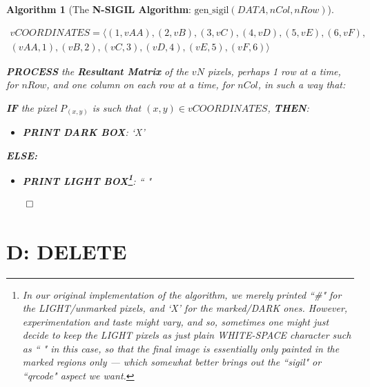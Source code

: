 \documentclass[a4paper, 18pt]{book} %
\newtheorem{alg}{Algorithm}
\begin{document}
\begin{alg}[The \textbf{N-SIGIL Algorithm}: $\text{gen\_sigil}(DATA, nCol, nRow)$]
\begin{enumerate}
{\begin{multline}
vCOORDINATES = \langle (1,vAA), (2,vB), (3,vC), (4,vD), (5,vE), (6,vF),\\
 (vAA,1), (vB,2), (vC,3),(vD,4), (vE,5), (vF,6) \rangle
\end{multline}

}

\item { \textbf{PROCESS} the \textbf{Resultant Matrix} of the $vN$ pixels, perhaps 1 row at a time, for $nRow$, and one column on each row at a time, for $nCol$, in such a way that:
\begin{itemize}
\item{ \textbf{IF} the pixel $P_{(x,y)}$ is such that $(x,y) \in vCOORDINATES$, \textbf{THEN}:
\begin{itemize}
\item \textbf{PRINT DARK BOX}: `X' 
\end{itemize}
\item{\textbf{ELSE:}
\begin{itemize}
\item \textbf{PRINT LIGHT BOX\footnote{In our original implementation of the algorithm, we merely printed ``\#" for the LIGHT/unmarked pixels, and `X' for the marked/DARK ones. However, experimentation and taste might vary, and so, sometimes one might just decide to keep the LIGHT pixels as just plain WHITE-SPACE character such as `` " in this case, so that the final image is essentially only painted in the marked regions only --- which somewhat better brings out the ``sigil" or ``qrcode" aspect we want.}}: `` " 
\end{itemize}
}
}
\end{itemize}

}
\end{enumerate}
$\qed$
\end{alg}
  
  
 
 
\chapter{D: DELETE}
\label{CHAPD}
\end{document}
